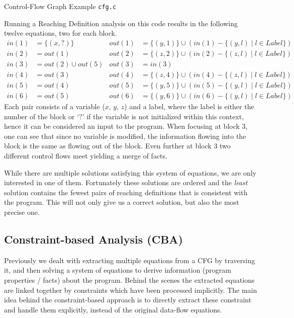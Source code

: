 \documentclass[article]{uibk}
\newenvironment{codebox}{\captionsetup{type=listing}}{}
\begin{document}
\begin{codebox}
    \vspace{-1.5em}
    \caption{Control-Flow Graph Example \texttt{cfg.c}}
    \label{src:cfg}
\end{codebox}

\vspace{1.5em}

Running a Reaching Definition analysis on this code results in the following
twelve equations, two for each block.
%
\begin{align*}
    in(1) &= \{(x,?)\}          & out(1) &= \{(y,1)\} \cup (in(1) - \{(y,l) \mid l \in Label\}) \\
    in(2) &= out(1)             & out(2) &= \{(z,2)\} \cup (in(2) - \{(z,l) \mid l \in Label\}) \\
    in(3) &= out(2) \cup out(5) & out(3) &= in(3) \\
    in(4) &= out(3)             & out(4) &= \{(z,4)\} \cup (in(4) - \{(z,l) \mid l \in Label\}) \\
    in(5) &= out(4)             & out(5) &= \{(y,5)\} \cup (in(5) - \{(y,l) \mid l \in Label\}) \\
    in(6) &= out(5)             & out(6) &= \{(y,6)\} \cup (in(6) - \{(y,l) \mid l \in Label\})
\end{align*}
%
Each pair consists of a variable ($x$, $y$, $z$) and a label, where the label
is either the number of the block or `$?$' if the variable is not initialized
within this context, hence it can be considered an input to the program. When
focusing at block $3$, one can see that since no variable is modified,
the information flowing into the block is the same as flowing out of the block.
Even further at block $3$ two different control flows meet yielding a merge of
facts.

While there are multiple solutions satisfying this system of equations, we are
only interested in one of them. Fortunately these solutions are ordered and the
\textit{least} solution contains the fewest pairs of reaching definitions that
is consistent with the program. This will not only give us a correct solution,
but also the most precise one.

\subsection{Constraint-based Analysis (CBA)}

Previously we dealt with extracting multiple equations from a CFG by traversing
it, and then solving a system of equations to derive information (program
properties / facts) about the program. Behind the scenes the extracted
equations are linked together by constraints which have been processed
implicitly. The main idea behind the constraint-based approach is to directly
extract these constraint and handle them explicitly, instead of the original
data-flow equations.~\cite{Nielson:ppa,herbert_phd}
\end{document}
